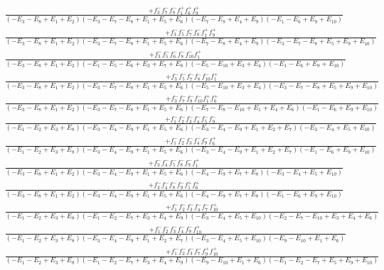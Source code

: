 \documentclass{article}
\begin{document}
\[\begin{array}{rcl}
\frac{+f_{3}^{-}f_{7}^{-}f_{8}^{-}f_{1}^{+}f_{6}^{+}f_{9}^{+}}{(-E_{3}-E_{8}+E_{1}+E_{2})(-E_{3}-E_{7}-E_{8}+E_{1}+E_{5}+E_{6})(-E_{7}-E_{8}+E_{4}+E_{9})(-E_{1}-E_{6}+E_{9}+E_{10})}\\
\frac{+f_{3}^{-}f_{5}^{-}f_{7}^{-}f_{8}^{-}f_{1}^{+}f_{9}^{+}}{(-E_{3}-E_{8}+E_{1}+E_{2})(-E_{3}-E_{7}-E_{8}+E_{1}+E_{5}+E_{6})(-E_{7}-E_{8}+E_{4}+E_{9})(-E_{3}-E_{7}-E_{8}+E_{5}+E_{9}+E_{10})}\\
\frac{+f_{3}^{-}f_{5}^{-}f_{6}^{-}f_{8}^{-}f_{10}^{-}f_{1}^{+}}{(-E_{3}-E_{8}+E_{1}+E_{2})(-E_{1}-E_{5}-E_{6}+E_{3}+E_{7}+E_{8})(-E_{5}-E_{10}+E_{3}+E_{4})(-E_{1}-E_{6}+E_{9}+E_{10})}\\
\frac{+f_{3}^{-}f_{5}^{-}f_{7}^{-}f_{8}^{-}f_{10}^{-}f_{1}^{+}}{(-E_{3}-E_{8}+E_{1}+E_{2})(-E_{3}-E_{7}-E_{8}+E_{1}+E_{5}+E_{6})(-E_{5}-E_{10}+E_{3}+E_{4})(-E_{3}-E_{7}-E_{8}+E_{5}+E_{9}+E_{10})}\\
\frac{+f_{3}^{-}f_{7}^{-}f_{8}^{-}f_{10}^{-}f_{1}^{+}f_{6}^{+}}{(-E_{3}-E_{8}+E_{1}+E_{2})(-E_{3}-E_{7}-E_{8}+E_{1}+E_{5}+E_{6})(-E_{7}-E_{8}-E_{10}+E_{1}+E_{4}+E_{6})(-E_{1}-E_{6}+E_{9}+E_{10})}\\
\frac{+f_{1}^{-}f_{2}^{-}f_{3}^{-}f_{4}^{-}f_{5}^{-}f_{9}^{-}}{(-E_{1}-E_{2}+E_{3}+E_{8})(-E_{3}-E_{4}-E_{9}+E_{1}+E_{5}+E_{6})(-E_{3}-E_{4}-E_{9}+E_{1}+E_{2}+E_{7})(-E_{3}-E_{4}+E_{5}+E_{10})}\\
\frac{+f_{1}^{-}f_{2}^{-}f_{3}^{-}f_{4}^{-}f_{9}^{-}f_{6}^{+}}{(-E_{1}-E_{2}+E_{3}+E_{8})(-E_{3}-E_{4}-E_{9}+E_{1}+E_{5}+E_{6})(-E_{3}-E_{4}-E_{9}+E_{1}+E_{2}+E_{7})(-E_{1}-E_{6}+E_{9}+E_{10})}\\
\frac{+f_{3}^{-}f_{4}^{-}f_{5}^{-}f_{8}^{-}f_{9}^{-}f_{1}^{+}}{(-E_{3}-E_{8}+E_{1}+E_{2})(-E_{3}-E_{4}-E_{9}+E_{1}+E_{5}+E_{6})(-E_{4}-E_{9}+E_{7}+E_{8})(-E_{3}-E_{4}+E_{5}+E_{10})}\\
\frac{+f_{3}^{-}f_{4}^{-}f_{8}^{-}f_{9}^{-}f_{1}^{+}f_{6}^{+}}{(-E_{3}-E_{8}+E_{1}+E_{2})(-E_{3}-E_{4}-E_{9}+E_{1}+E_{5}+E_{6})(-E_{4}-E_{9}+E_{7}+E_{8})(-E_{1}-E_{6}+E_{9}+E_{10})}\\
\frac{+f_{1}^{-}f_{2}^{-}f_{3}^{-}f_{4}^{-}f_{7}^{-}f_{10}^{+}}{(-E_{1}-E_{2}+E_{3}+E_{8})(-E_{1}-E_{2}-E_{7}+E_{3}+E_{4}+E_{9})(-E_{3}-E_{4}+E_{5}+E_{10})(-E_{2}-E_{7}-E_{10}+E_{3}+E_{4}+E_{6})}\\
\frac{+f_{1}^{-}f_{2}^{-}f_{3}^{-}f_{4}^{-}f_{9}^{-}f_{10}^{+}}{(-E_{1}-E_{2}+E_{3}+E_{8})(-E_{3}-E_{4}-E_{9}+E_{1}+E_{2}+E_{7})(-E_{3}-E_{4}+E_{5}+E_{10})(-E_{9}-E_{10}+E_{1}+E_{6})}\\
\frac{+f_{1}^{-}f_{2}^{-}f_{3}^{-}f_{7}^{-}f_{9}^{+}f_{10}^{+}}{(-E_{1}-E_{2}+E_{3}+E_{8})(-E_{1}-E_{2}-E_{7}+E_{3}+E_{4}+E_{9})(-E_{9}-E_{10}+E_{1}+E_{6})(-E_{1}-E_{2}-E_{7}+E_{5}+E_{9}+E_{10})}\\

\end{array}\]
\end{document}
